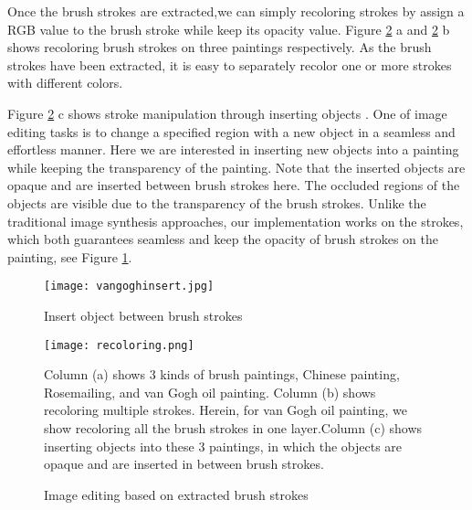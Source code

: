 Once the brush strokes are extracted,we can simply recoloring strokes by assign a RGB value to the brush stroke while keep its opacity value.
Figure \ref{recoloring} a and \ref{recoloring} b shows recoloring brush strokes on three paintings respectively. As the brush strokes have been extracted, it is easy to separately recolor one or more strokes with different colors. 

Figure \ref{recoloring} c shows stroke manipulation through inserting objects . One of image editing tasks is to change a specified region with a new object in a seamless and effortless manner. Here we are interested in inserting new objects into a painting while keeping the transparency of the painting. Note that the inserted objects are opaque and are inserted between  brush strokes here. The occluded regions of the objects are visible due to the transparency of the brush strokes. Unlike the traditional image synthesis approaches, our implementation works on the strokes, which both guarantees seamless and keep the opacity of brush strokes on the painting, see Figure \ref{cominsert}.
\begin{figure}[H]
	\centering
	\texttt{[image: vangoghinsert.jpg]}
	\caption{ Insert object between brush strokes}
	\label{cominsert}
\end{figure}

\begin{figure}[H]
	\centering
	\texttt{[image: recoloring.png]}
	\caption{Image editing based on extracted brush strokes}
	\label{recoloring}
	\medskip
Column (a) shows 3 kinds of brush paintings, Chinese painting, Rosemailing, and van Gogh oil painting. Column (b) shows recoloring multiple strokes. Herein, for van Gogh oil painting, we show recoloring all the brush strokes in one layer.Column (c) shows inserting objects into these 3 paintings, in which the objects are opaque and are inserted in between brush strokes.

\end{figure}

